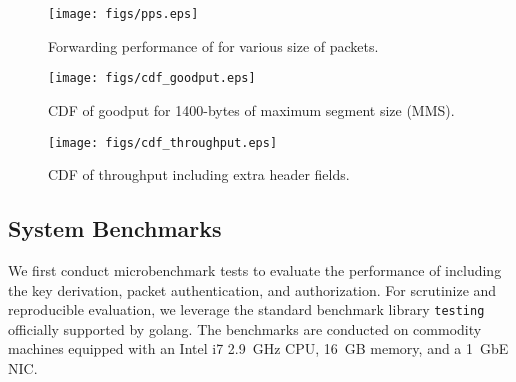 
\begin{figure*}[!htb]
	\begin{minipage}{.32\linewidth}
		\centering
		\texttt{[image: figs/pps.eps]}
		\caption{Forwarding performance of \tp for various size of packets.}
		\label{fig:forwarding}
	\end{minipage}\hspace*{1em}
	\begin{minipage}{.32\linewidth}
		\centering
		\texttt{[image: figs/cdf\_goodput.eps]}
		\caption{CDF of goodput for 1400-bytes of maximum segment size (MMS).}
		\label{fig:goodput}
	\end{minipage}\hspace*{1em}
	\begin{minipage}{.32\linewidth}
		\centering
		\texttt{[image: figs/cdf\_throughput.eps]}
		\caption{CDF of throughput including extra header fields.}
		\label{fig:throughput}
	\end{minipage}
\end{figure*}

\subsection{System Benchmarks}
\label{ssec:systembenchmark}

We first conduct microbenchmark tests to evaluate the performance of \tp including the key
derivation, packet authentication, and authorization. For scrutinize and reproducible evaluation, 
we leverage the standard benchmark library \texttt{testing} officially supported by golang. 
The benchmarks are conducted on commodity machines equipped with an Intel i7 \SI{2.9}{GHz} 
CPU, \SI{16}{GB} memory, and a \SI{1}{GbE} NIC.

